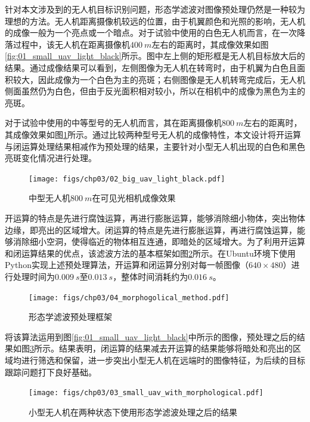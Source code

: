 针对本文涉及到的无人机目标识别问题，形态学滤波对图像预处理仍然是一种较为理想的方法。无人机距离摄像机较远的位置，由于机翼颜色和光照的影响，无人机的成像一般为一个亮点或一个暗点。对于试验中使用的白色无人机而言，在一次降落过程中，该无人机在距离摄像机$400\ m$左右的距离时，其成像效果如图\ref{fig:01_small_uav_light_black}所示。图中左上侧的矩形框是无人机目标放大后的结果。通过成像结果可以看到，左侧图像为无人机在转弯时，由于机翼为白色且面积较大，因此成像为一个白色为主的亮斑；右侧图像是无人机转弯完成后，无人机侧面虽然仍为白色，但由于反光面积相对较小，所以在相机中的成像为黑色为主的亮斑。


对于试验中使用的中等型号的无人机而言，其在距离摄像机$800\ m$左右的距离时，其成像效果如图\ref{fig:02_big_uav_light_black}所示。通过比较两种型号无人机的成像特性，本文设计将开运算与闭运算处理结果相减作为预处理的结果，主要针对小型无人机出现的白色和黑色亮斑变化情况进行处理。

\begin{figure}[htb]   
	\centering
	\texttt{[image: figs/chp03/02\_big\_uav\_light\_black.pdf]}
	\caption{中型无人机$800\ m$在可见光相机成像效果}
	\label{fig:02_big_uav_light_black}
\end{figure}

开运算的特点是先进行腐蚀运算，再进行膨胀运算，能够消除细小物体，突出物体边缘，即亮出的区域增大。闭运算的特点是先进行膨胀运算，再进行腐蚀运算，能够消除细小空洞，使得临近的物体相互连通，即暗处的区域增大。为了利用开运算和闭运算结果的优点，该滤波方法的基本框架如图\ref{fig:04_morphogolical_method}所示。在Ubuntu环境下使用Python实现上述预处理算法，开运算和闭运算分别对每一帧图像（$640 \times 480$）进行处理时间为$0.009\ s$至$0.013\ s$，整体时间消耗约为$0.016\ s$。

\begin{figure}[htb]   
	\centering
	\texttt{[image: figs/chp03/04\_morphogolical\_method.pdf]}
	\caption{形态学滤波预处理框架}
	\label{fig:04_morphogolical_method}
\end{figure}

将该算法运用到图\ref{fig:01_small_uav_light_black}中所示的图像，预处理之后的结果如图\ref{fig:03_small_uav_with_morphological}所示。结果表明，闭运算的结果减去开运算的结果能够将暗处和亮出的区域均进行筛选和保留，进一步突出小型无人机在远端时的图像特征，为后续的目标跟踪问题打下良好基础。

\begin{figure}[htb]   
	\centering
	\texttt{[image: figs/chp03/03\_small\_uav\_with\_morphological.pdf]}
	\caption{小型无人机在两种状态下使用形态学滤波处理之后的结果}
	\label{fig:03_small_uav_with_morphological}
\end{figure}


